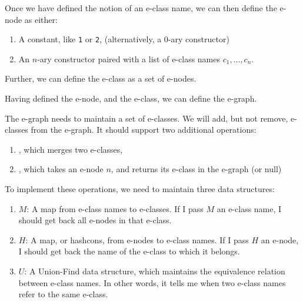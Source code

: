 Once we have defined the notion of an e-class name, we can then define the e-node as either:
\begin{enumerate}
  \item A constant, like \texttt{1} or \texttt{2}, (alternatively, a $0$-ary constructor)
  \item An $n$-ary constructor paired with a list of e-class names $c_1, \ldots, c_n$.
\end{enumerate}
Further, we can define the e-class as a set of e-nodes. 

Having defined the e-node, and the e-class, we can define the e-graph. 

The e-graph needs to maintain a set of e-classes. We will add, but not remove, e-classes from the e-graph. 
It should support two additional operations:
\begin{enumerate}
  \item {}, which merges two e-classes, 
  \item {}, which takes an e-node $n$, and returns its e-class in the e-graph (or null)
\end{enumerate}

To implement these operations, we need to maintain three data structures:
\begin{enumerate}
  \item $M$: A map from e-class names to e-classes. If I pass $M$ an e-class name, I should get back all e-nodes in that e-class.
  \item $H$: A map, or hashcons, from e-nodes to e-class names. If I pass $H$ an e-node, I should get back the name of the e-class to which it belongs.
  \item $U$: A Union-Find data structure, which maintains the equivalence relation between e-class names. In other words, it tells me when two e-class 
             names refer to the same e-class.
\end{enumerate}

